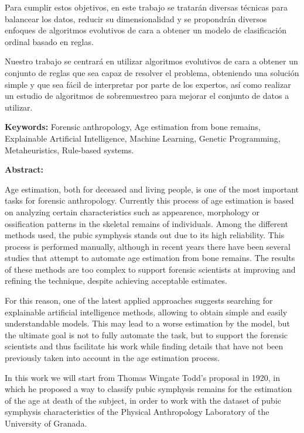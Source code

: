 Para cumplir estos objetivos, en este trabajo se tratarán diversas técnicas para balancear los datos, reducir su dimensionalidad y se propondrán diversos enfoques de algoritmos evolutivos de cara a obtener un modelo de clasificación ordinal basado en reglas.

Nuestro trabajo se centrará en utilizar algoritmos evolutivos de cara a obtener un conjunto de reglas que sea capaz de resolver el problema, obteniendo una solución simple y que sea fácil de interpretar por parte de los expertos, así como realizar un estudio de algoritmos de sobremuestreo para mejorar el conjunto de datos a utilizar.

\newpage


\begin{center}
	{\large\textbf{\thetitleEN}}


	\theauthor
\end{center}

\textbf{Keywords:} Forensic anthropology, Age estimation from bone remains, Explainable Artificial Intelligence,
Machine Learning, Genetic Programming, Metaheuristics, Rule-based systems.

\textbf{Abstract:}

Age estimation, both for deceased and living people, is one of the most important tasks for forensic anthropology. Currently this process of age estimation is based on analyzing certain characteristics such as appearence, morphology or ossification patterns in the skeletal remains of individuals. Among the different methods used, the pubic symphysis stands out due to its high reliability. This process is performed manually, although in recent years there have been several studies that attempt to automate age estimation from bone remains. The results of these methods are too complex to support forensic scientists at improving and refining the technique, despite achieving acceptable estimates.

For this reason, one of the latest applied approaches suggests searching for explainable artificial intelligence methods, allowing to obtain simple and easily understandable models. This may lead to a worse estimation by the model, but the ultimate goal is not to fully automate the task, but to support the forensic scientists and thus facilitate his work while finding details that have not been previously taken into account in the age estimation process.

In this work we will start from Thomas Wingate Todd's proposal in 1920, in which he proposed a way to classify pubic symphysis remains for the estimation of the age at death of the subject, in order to work with the dataset of pubic symphysis characteristics of the Physical Anthropology Laboratory of the University of Granada.


